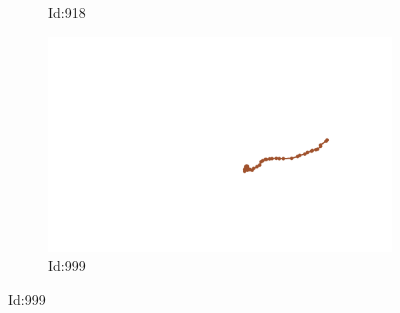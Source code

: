 \documentclass[12pt,twoside]{report}
\begin{document}
\begin{figure}
\begin{subfigure}[b]{0.20\textwidth}
\caption{Id:918}
\end{subfigure}
\begin{subfigure}[b]{0.20\textwidth}
\centering
\includegraphics[width=\textwidth]{../../trajectories/999.png}
\caption{Id:999}
\end{subfigure}
\end{figure}
\end{document}
